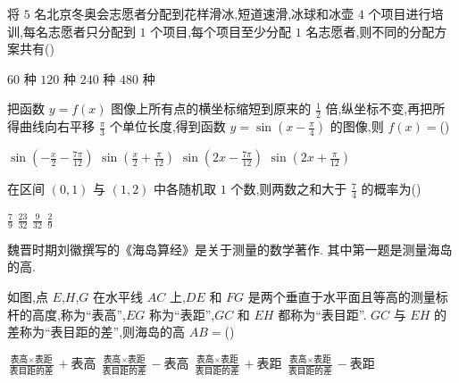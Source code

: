 \begin{problem}
将 \(5\) 名北京冬奥会志愿者分配到花样滑冰,短道速滑,冰球和冰壶 \(4\) 个项目进行培训,每名志愿者只分配到 \(1\) 个项目,每个项目至少分配 \(1\) 名志愿者,则不同的分配方案共有(\quad)

\choices
    {\(60\) 种}
    {\(120\) 种}
    {\(240\) 种}
    {\(480\) 种}

\end{problem}

\begin{problem}
把函数 \(y=f(x)\) 图像上所有点的横坐标缩短到原来的 \(\frac{1}{2}\) 倍,纵坐标不变,再把所得曲线向右平移 \(\frac{\pi}{3}\) 个单位长度,得到函数 \(y=\sin\left( x-\frac{\pi}{4} \right)\) 的图像,则 \(f(x)=\)(\quad)

\choices
    {\(\sin\left( -\frac{x}{2}-\frac{7\pi}{12} \right)\)}
    {\(\sin\left( \frac{x}{2}+\frac{\pi}{12} \right)\)}
    {\(\sin\left( 2x-\frac{7\pi}{12} \right)\)}
    {\(\sin\left( 2x+\frac{\pi}{12} \right)\)}

\end{problem}

\begin{problem}
在区间 \((0,1)\) 与 \((1,2)\) 中各随机取 \(1\) 个数,则两数之和大于 \(\frac{7}{4}\) 的概率为(\quad)

\choices
    {\(\frac{7}{9}\)}
    {\(\frac{23}{32}\)}
    {\(\frac{9}{32}\)}
    {\(\frac{2}{9}\)}

\end{problem}

\begin{problem}
魏晋时期刘徽撰写的《海岛算经》是关于测量的数学著作. 其中第一题是测量海岛的高.

如图,点 \(E\),\(H\),\(G\) 在水平线 \(AC\) 上,\(DE\) 和 \(FG\) 是两个垂直于水平面且等高的测量标杆的高度,称为``表高'',\(EG\) 称为``表距'',\(GC\) 和 \(EH\) 都称为``表目距''. \(GC\) 与 \(EH\) 的差称为``表目距的差'',则海岛的高 \(AB=\)(\quad)


\choices
    {\(\frac{\text{表高}\times \text{表距}}{\text{表目距的差}}+\text{表高}\)}
    {\(\frac{\text{表高}\times \text{表距}}{\text{表目距的差}}-\text{表高}\)}
    {\(\frac{\text{表高}\times \text{表距}}{\text{表目距的差}}+\text{表距}\)}
    {\(\frac{\text{表高}\times \text{表距}}{\text{表目距的差}}-\text{表距}\)}

\end{problem}

